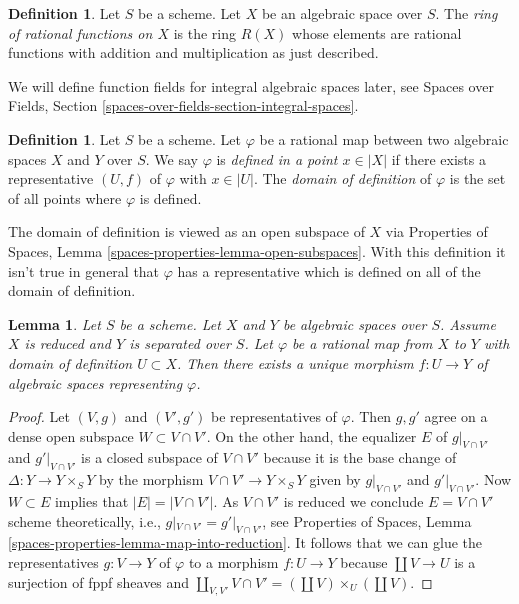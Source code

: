 \documentclass{stacks-project}
\theoremstyle{plain}
\newtheorem{lemma}[subsection]{Lemma}
\theoremstyle{definition}
\newtheorem{definition}[subsection]{Definition}
\theoremstyle{remark}
\numberwithin{equation}{subsection}
\begin{document}
\begin{definition}
\label{definition-ring-of-rational-functions}
Let $S$ be a scheme.
Let $X$ be an algebraic space over $S$.
The {\it ring of rational functions on $X$}
is the ring $R(X)$ whose elements are rational functions with
addition and multiplication as just described.
\end{definition}

\noindent
We will define function fields for integral algebraic spaces later, see
Spaces over Fields, Section \ref{spaces-over-fields-section-integral-spaces}.

\begin{definition}
\label{definition-domain-of-definition}
Let $S$ be a scheme. Let $\varphi$ be a rational map between two
algebraic spaces $X$ and $Y$ over $S$. We say
$\varphi$ is {\it defined in a point $x \in |X|$} if there exists a
representative $(U, f)$ of $\varphi$ with $x \in |U|$. The
{\it domain of definition} of $\varphi$ is the set of all points
where $\varphi$ is defined.
\end{definition}

\noindent
The domain of definition is viewed as an open subspace of $X$ via
Properties of Spaces, Lemma \ref{spaces-properties-lemma-open-subspaces}.
With this definition it isn't true in general that $\varphi$ has a
representative which is defined on all of the domain of definition.

\begin{lemma}
\label{lemma-rational-map-from-reduced-to-separated}
Let $S$ be a scheme. Let $X$ and $Y$ be algebraic spaces over $S$.
Assume $X$ is reduced and $Y$ is separated over $S$. Let
$\varphi$ be a rational map from $X$ to $Y$ with domain of definition
$U \subset X$. Then there exists a unique morphism $f : U \to Y$
of algebraic spaces representing $\varphi$.
\end{lemma}

\begin{proof}
Let $(V, g)$ and $(V', g')$ be representatives of $\varphi$. Then
$g, g'$ agree on a dense open subspace $W \subset V \cap V'$.
On the other hand, the equalizer $E$ of $g|_{V \cap V'}$ and $g'|_{V \cap V'}$
is a closed subspace of $V \cap V'$ because it is the base change
of $\Delta : Y \to Y \times_S Y$ by the morphism
$V \cap V' \to Y \times_S Y$ given by $g|_{V \cap V'}$ and $g'|_{V \cap V'}$.
Now $W \subset E$ implies that $|E| = |V \cap V'|$. As $V \cap V'$
is reduced we conclude $E = V \cap V'$ scheme theoretically, i.e.,
$g|_{V \cap V'} = g'|_{V \cap V'}$, see
Properties of Spaces, Lemma \ref{spaces-properties-lemma-map-into-reduction}.
It follows that we can glue the representatives $g : V \to Y$ of $\varphi$
to a morphism $f : U \to Y$ because $\coprod V \to U$ is a surjection of
fppf sheaves and
$\coprod_{V, V'} V \cap V' = (\coprod V) \times_U (\coprod V)$.
\end{proof}
\end{document}
